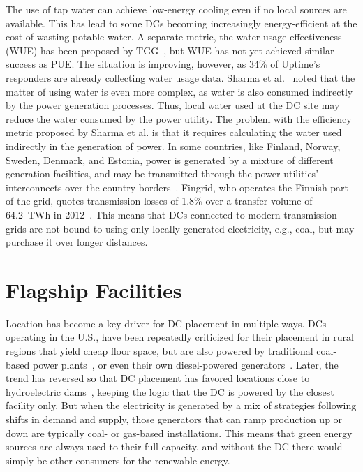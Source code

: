 \documentclass[officiallayout]{tktla}
\begin{document}
The use of tap water can achieve low-energy cooling even if no local sources
are available. This has lead to some DCs becoming increasingly
energy-efficient at the cost of wasting potable water. A separate metric, the
water usage effectiveness (WUE) has been proposed by TGG~\cite{Patterson2011},
but WUE has not yet achieved similar success as PUE. The situation is
improving, however, as 34\% of Uptime's~\cite{Stansberry2012} responders are
already collecting water usage data. Sharma et al.~\cite{Sharma2009} noted
that the matter of using water is even more complex, as water is also consumed
indirectly by the power generation processes. Thus, local water used at the DC
site may reduce the water consumed by the power utility. The problem with the
efficiency metric proposed by Sharma et al. is that it requires calculating
the water used indirectly in the generation of power. In some countries, like
Finland, Norway, Sweden, Denmark, and Estonia, power is generated by a mixture
of different generation facilities, and may be transmitted through the power
utilities' interconnects over the country borders~\cite{Entso-E2013}. Fingrid,
who operates the Finnish part of the grid, quotes transmission losses of 1.8\%
over a transfer volume of 64.2~TWh in 2012~\cite{Fingrid2012}. This means that
DCs connected to modern transmission grids are not bound to using only locally
generated electricity, e.g., coal, but may purchase it over longer distances.


\section{Flagship Facilities}
\label{sec:flagships}

Location has become a key driver for DC placement in multiple ways. DCs
operating in the U.S., have been repeatedly criticized for their placement in
rural regions that yield cheap floor space, but are also powered by
traditional coal-based power plants~\cite{Huber1999,VanHorn2011}, or even
their own diesel-powered generators~\cite{Glantz2012b}. Later, the trend has
reversed so that DC placement has favored locations close to hydroelectric
dams~\cite{Gilder2006}, keeping the logic that the DC is powered by the
closest facility only. But when the electricity is generated by a mix of
strategies following shifts in demand and supply, those generators that can
ramp production up or down are typically coal- or gas-based installations.
This means that green energy sources are always used to their full capacity,
and without the DC there would simply be other consumers for the renewable
energy.
\end{document}
